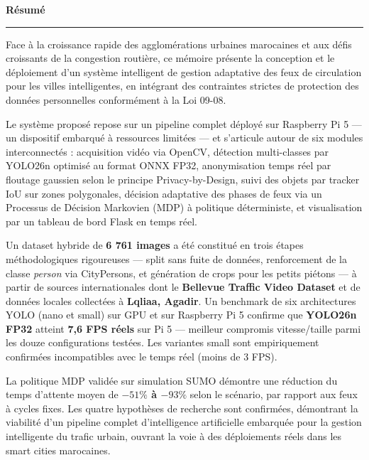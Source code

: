 
\newpage
\thispagestyle{empty}

\begin{center}
{\Large\bfseries\color{PrimaryBlue} Résumé}
\end{center}
\vspace{0.3cm}
\rule{\linewidth}{0.4pt}
\vspace{0.3cm}

{\normalsize
Face à la croissance rapide des agglomérations urbaines
marocaines et aux défis croissants de la congestion routière,
ce mémoire présente la conception et le déploiement d'un
système intelligent de gestion adaptative des feux de
circulation pour les villes intelligentes, en intégrant
des contraintes strictes de protection des données
personnelles conformément à la Loi 09-08.

Le système proposé repose sur un pipeline complet déployé
sur Raspberry Pi 5 — un dispositif embarqué à ressources
limitées — et s'articule autour de six modules interconnectés :
acquisition vidéo via OpenCV, détection multi-classes par
YOLO26n optimisé au format ONNX FP32, anonymisation temps réel
par floutage gaussien selon le principe Privacy-by-Design,
suivi des objets par tracker IoU sur zones polygonales,
décision adaptative des phases de feux via un Processus
de Décision Markovien (MDP) à politique déterministe,
et visualisation par un tableau de bord Flask en temps réel.

Un dataset hybride de \textbf{6 761 images} a été constitué
en trois étapes méthodologiques rigoureuses — split sans
fuite de données, renforcement de la classe \textit{person}
via CityPersons, et génération de crops pour les petits
piétons — à partir de sources internationales dont le
\textbf{Bellevue Traffic Video Dataset} et de données
locales collectées à \textbf{Lqliaa, Agadir}.
Un benchmark de six architectures YOLO (nano et small)
sur GPU et sur Raspberry Pi 5 confirme que \textbf{YOLO26n
FP32} atteint \textbf{7,6 FPS réels} sur Pi 5 — meilleur
compromis vitesse/taille parmi les douze configurations
testées. Les variantes small sont empiriquement confirmées
incompatibles avec le temps réel (moins de 3 FPS).

La politique MDP validée sur simulation SUMO démontre
une réduction du temps d'attente moyen de
\textbf{$-51\%$ à $-93\%$} selon le scénario,
par rapport aux feux à cycles fixes.
Les quatre hypothèses de recherche sont confirmées,
démontrant la viabilité d'un pipeline complet
d'intelligence artificielle embarquée pour la gestion
intelligente du trafic urbain, ouvrant la voie à des
déploiements réels dans les smart cities marocaines.
}

